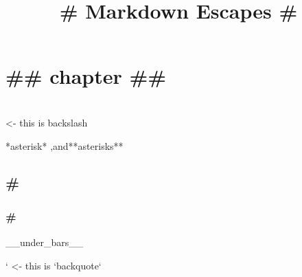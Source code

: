 \documentclass[a4paper,11pt,oneside,openany,report]{jsbook}
\title{# Markdown Escapes #}
\begin{document}
\maketitle
\chapter{## chapter ##}
\\ <- this is backslash

*asterisk*
,and**asterisks**

\section{#}
\subsection{#}
__under_bars__

` <- this is `backquote`
\end{document}
